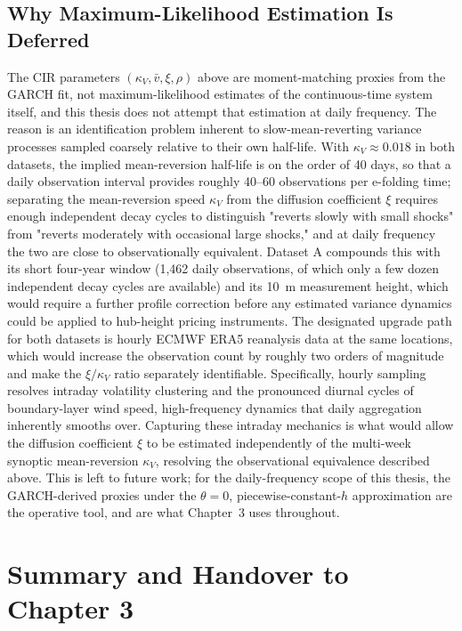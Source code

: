 \documentclass[11pt, a4paper, twoside]{article}
\begin{document}
\subsection{Why Maximum-Likelihood Estimation Is Deferred}
\label{sec:phase5-mle}

The CIR parameters $(\kappa_V, \bar v, \xi, \rho)$ above are moment-matching proxies from the GARCH fit, not maximum-likelihood estimates of the continuous-time system itself, and this thesis does not attempt that estimation at daily frequency. The reason is an identification problem inherent to slow-mean-reverting variance processes sampled coarsely relative to their own half-life. With $\kappa_V \approx 0.018$ in both datasets, the implied mean-reversion half-life is on the order of 40 days, so that a daily observation interval provides roughly 40--60 observations per e-folding time; separating the mean-reversion speed $\kappa_V$ from the diffusion coefficient $\xi$ requires enough independent decay cycles to distinguish "reverts slowly with small shocks" from "reverts moderately with occasional large shocks," and at daily frequency the two are close to observationally equivalent. Dataset A compounds this with its short four-year window (1,462 daily observations, of which only a few dozen independent decay cycles are available) and its 10~m measurement height, which would require a further profile correction before any estimated variance dynamics could be applied to hub-height pricing instruments. The designated upgrade path for both datasets is hourly ECMWF ERA5 reanalysis data at the same locations, which would increase the observation count by roughly two orders of magnitude and make the $\xi/\kappa_V$ ratio separately identifiable. Specifically, hourly sampling resolves intraday volatility clustering and the pronounced diurnal cycles of boundary-layer wind speed, high-frequency dynamics that daily aggregation inherently smooths over. Capturing these intraday mechanics is what would allow the diffusion coefficient $\xi$ to be estimated independently of the multi-week synoptic mean-reversion $\kappa_V$, resolving the observational equivalence described above. This is left to future work; for the daily-frequency scope of this thesis, the GARCH-derived proxies under the $\theta=0$, piecewise-constant-$h$ approximation are the operative tool, and are what Chapter~3 uses throughout.

\section{Summary and Handover to Chapter 3}
\label{sec:phase-summary}
\end{document}
